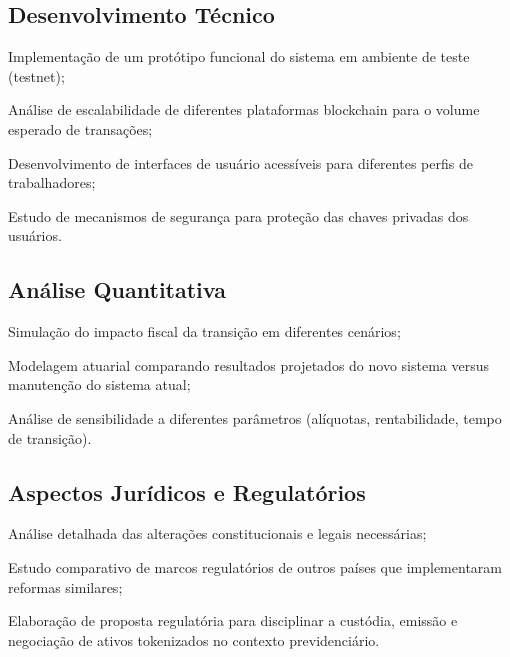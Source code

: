 \subsection{Desenvolvimento Técnico}

\begin{alineas}
    \item Implementação de um protótipo funcional do sistema em ambiente de teste (testnet);
    \item Análise de escalabilidade de diferentes plataformas blockchain para o volume esperado de transações;
    \item Desenvolvimento de interfaces de usuário acessíveis para diferentes perfis de trabalhadores;
    \item Estudo de mecanismos de segurança para proteção das chaves privadas dos usuários.
\end{alineas}

\subsection{Análise Quantitativa}

\begin{alineas}
    \item Simulação do impacto fiscal da transição em diferentes cenários;
    \item Modelagem atuarial comparando resultados projetados do novo sistema versus manutenção do sistema atual;
    \item Análise de sensibilidade a diferentes parâmetros (alíquotas, rentabilidade, tempo de transição).
\end{alineas}

\subsection{Aspectos Jurídicos e Regulatórios}

\begin{alineas}
    \item Análise detalhada das alterações constitucionais e legais necessárias;
    \item Estudo comparativo de marcos regulatórios de outros países que implementaram reformas similares;
    \item Elaboração de proposta regulatória para disciplinar a custódia, emissão e negociação de ativos tokenizados no contexto previdenciário.
\end{alineas}


